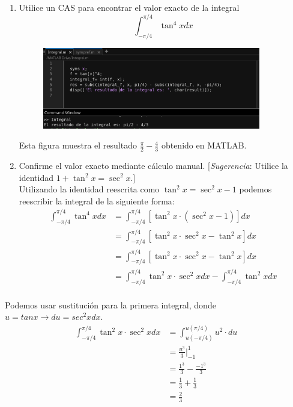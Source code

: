 \documentclass[12pt]{article}
\begin{document}
\begin{enumerate}[label=(\alph*)]
\item Utilice un CAS para encontrar el valor exacto de la integral
  \[
  \int_{-\pi/4}^{\pi/4} \tan^4{x} dx
  \]
\begin{figure}[H]
  \centering
  \includegraphics[width=0.9\textwidth]{../img/img_Lista4/cas2.png}
\end{figure}
Esta figura muestra el resultado $\frac{\pi}{2} - \frac{4}{3}$ obtenido en MATLAB.
\item Confirme el valor exacto mediante cálculo manual. [\textit{Sugerencia}: Utilice la identidad $1 + \tan^2{x}=\sec^2{x}$.]\\
  Utilizando la identidad reescrita como $\tan^2{x}=\sec^2{x}-1$  podemos reescribir la integral de la siguiente forma:
  \begin{align*}
    \int_{-\pi/4}^{\pi/4} \tan^4{x} dx
    & = \int_{-\pi/4}^{\pi/4} \left[ \tan^2{x} \cdot (\sec^2{x}-1) \right]dx \\
    & = \int_{-\pi/4}^{\pi/4} [\tan^2{x} \cdot \sec^2{x} -  \tan^2{x} ] dx \\
    & = \int_{-\pi/4}^{\pi/4} [\tan^2{x} \cdot \sec^2{x} -  \tan^2{x} ] dx \\
    & = \int_{-\pi/4}^{\pi/4} \tan^2{x} \cdot \sec^2{x} dx - \int_{-\pi/4}^{\pi/4}   \tan^2{x}  dx \\
  \end{align*}
\end{enumerate}
Podemos usar sustitución para la primera integral, donde $u= tanx \rightarrow du=sec^{2}x dx$.\\
  \begin{align*}
    \int_{-\pi/4}^{\pi/4} \tan^2{x} \cdot \sec^2{x} dx
    & = \int_{u(-\pi/4)}^{u(\pi/4)} u^2 \cdot du \\
    & = \frac{u^{3}}{3} \Bigg|_{-1}^{1} \\
    & = \frac{1^{3}}{3} - \frac{-1^{3}}{3}  \\
    & = \frac{1}{3} + \frac{1}{3}  \\
    & = \frac{2}{3}   \\
  \end{align*}
\end{document}
